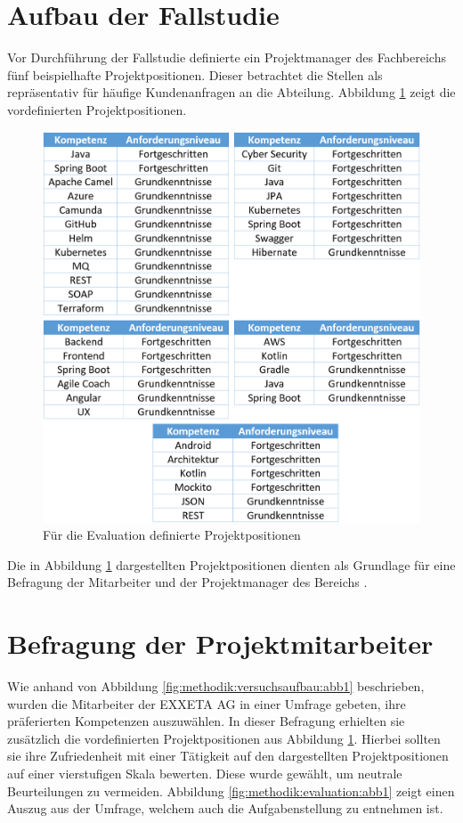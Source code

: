 \section{Aufbau der Fallstudie}
\label{ch:methodik:evaluation}
Vor Durchführung der Fallstudie definierte ein Projektmanager des Fachbereichs \JES fünf beispielhafte Projektpositionen. Dieser betrachtet die Stellen als repräsentativ für häufige Kundenanfragen an die Abteilung. Abbildung \ref{fig:methodik:evaluation:abb2} zeigt die vordefinierten Projektpositionen.

\begin{figure}[h]
	\centering
	\includegraphics[width=1.0\textwidth]{gfx/Projekt.png}
	\caption{Für die Evaluation definierte Projektpositionen}
	\label{fig:methodik:evaluation:abb2}
\end{figure}

Die in Abbildung \ref{fig:methodik:evaluation:abb2} dargestellten Projektpositionen dienten als Grundlage für eine Befragung der Mitarbeiter und der Projektmanager des Bereichs \JES.

\section{Befragung der Projektmitarbeiter}
\label{ch:methodik:evaluation:mitarbeiter}
Wie anhand von Abbildung \ref{fig:methodik:versuchsaufbau:abb1} beschrieben, wurden die Mitarbeiter der EXXETA AG in einer Umfrage gebeten, ihre präferierten Kompetenzen auszuwählen. In dieser Befragung erhielten sie zusätzlich die vordefinierten Projektpositionen aus Abbildung \ref{fig:methodik:evaluation:abb2}. Hierbei sollten sie ihre Zufriedenheit mit einer Tätigkeit auf den dargestellten Projektpositionen auf einer vierstufigen Skala bewerten. Diese wurde gewählt, um neutrale Beurteilungen zu vermeiden. Abbildung \ref{fig:methodik:evaluation:abb1} zeigt einen Auszug aus der Umfrage, welchem auch die Aufgabenstellung zu entnehmen ist.


